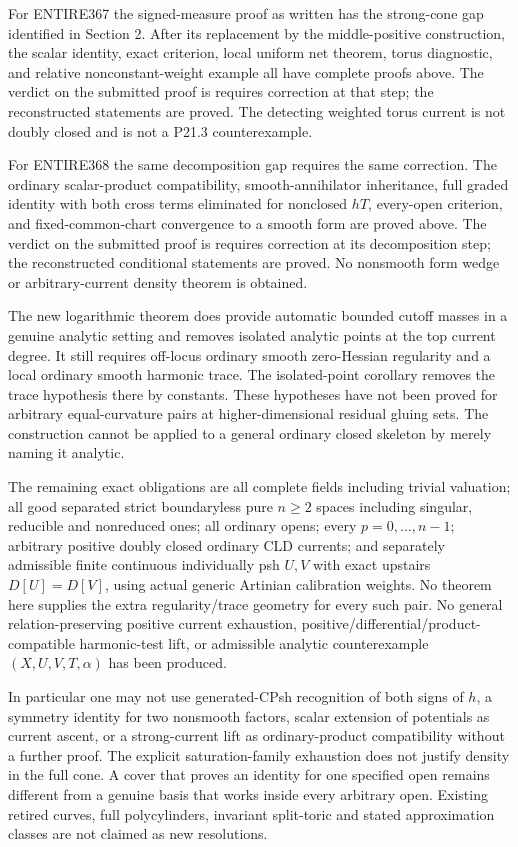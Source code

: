 \documentclass[11pt]{article}
\begin{document}
For ENTIRE367 the signed-measure proof as written has the strong-cone gap identified in Section 2. After its replacement by the middle-positive construction, the scalar identity, exact criterion, local uniform net theorem, torus diagnostic, and relative nonconstant-weight example all have complete proofs above. The verdict on the submitted proof is requires correction at that step; the reconstructed statements are proved. The detecting weighted torus current is not doubly closed and is not a P21.3 counterexample.

For ENTIRE368 the same decomposition gap requires the same correction. The ordinary scalar-product compatibility, smooth-annihilator inheritance, full graded identity with both cross terms eliminated for nonclosed \(hT\), every-open criterion, and fixed-common-chart convergence to a smooth form are proved above. The verdict on the submitted proof is requires correction at its decomposition step; the reconstructed conditional statements are proved. No nonsmooth form wedge or arbitrary-current density theorem is obtained.

The new logarithmic theorem does provide automatic bounded cutoff masses in a genuine analytic setting and removes isolated analytic points at the top current degree. It still requires off-locus ordinary smooth zero-Hessian regularity and a local ordinary smooth harmonic trace. The isolated-point corollary removes the trace hypothesis there by constants. These hypotheses have not been proved for arbitrary equal-curvature pairs at higher-dimensional residual gluing sets. The construction cannot be applied to a general ordinary closed skeleton by merely naming it analytic.

The remaining exact obligations are all complete fields including trivial valuation; all good separated strict boundaryless pure \(n\geq2\) spaces including singular, reducible and nonreduced ones; all ordinary opens; every \(p=0,\ldots,n-1\); arbitrary positive doubly closed ordinary CLD currents; and separately admissible finite continuous individually psh \(U,V\) with exact upstairs \(D[U]=D[V]\), using actual generic Artinian calibration weights. No theorem here supplies the extra regularity/trace geometry for every such pair. No general relation-preserving positive current exhaustion, positive/differential/product-compatible harmonic-test lift, or admissible analytic counterexample \((X,U,V,T,\alpha)\) has been produced.

In particular one may not use generated-CPsh recognition of both signs of \(h\), a symmetry identity for two nonsmooth factors, scalar extension of potentials as current ascent, or a strong-current lift as ordinary-product compatibility without a further proof. The explicit saturation-family exhaustion does not justify density in the full cone. A cover that proves an identity for one specified open remains different from a genuine basis that works inside every arbitrary open. Existing retired curves, full polycylinders, invariant split-toric and stated approximation classes are not claimed as new resolutions.
\end{document}
